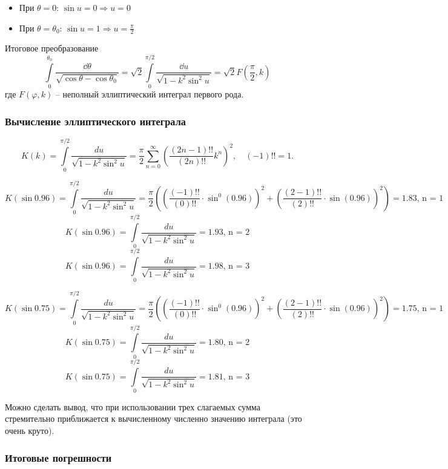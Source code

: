 \documentclass{report}
\begin{document}
\begin{enumerate}
\begin{itemize}
\item При $\theta = 0$: $\sin u = 0 \Rightarrow u = 0$
\item При $\theta = \theta_0$: $\sin u = 1 \Rightarrow u = \frac{\pi}{2}$
\end{itemize}

Итоговое преобразование
\begin{equation}
\int\limits_0^{\theta_0} \frac{\dd{\theta}}{\sqrt{\cos\theta - \cos\theta_0}} = \sqrt{2} \int\limits_0^{\pi/2} \frac{\dd{u}}{\sqrt{1 - k^2\sin^2 u}} = \sqrt{2} F\left(\frac{\pi}{2}, k\right)
\label{eq:result}
\end{equation}
где $F(\varphi,k)$ -- неполный эллиптический интеграл первого рода.


\subsubsection{Вычисление эллиптического интеграла}

\[
K(k) = \int\limits_0^{\pi/2} \frac{du}{\sqrt{1 - k^2 \sin^2 u}} 
      = \frac{\pi}{2} \sum_{n=0}^\infty \left( \frac{(2n-1)!!}{(2n)!!} k^n \right)^2,
      \quad (-1)!! = 1.
\]

\[
K(\sin{0.96}) = \int\limits_0^{\pi/2} \frac{du}{\sqrt{1 - k^2 \sin^2 u}} 
      = \frac{\pi}{2} \left(\left( \frac{(-1)!!}{(0)!!}\cdot \sin^0(0.96) \right)^2 +\left( \frac{(2-1)!!}{(2)!!}\cdot \sin(0.96) \right)^2\right) = 1.83 \text{, n  = 1}
\]
\[
K(\sin{0.96}) = \int\limits_0^{\pi/2} \frac{du}{\sqrt{1 - k^2 \sin^2 u}} = 1.93 \text{, n  = 2}
\]
\[
K(\sin{0.96}) = \int\limits_0^{\pi/2} \frac{du}{\sqrt{1 - k^2 \sin^2 u}} = 1.98 \text{, n  = 3}
\]


\[
K(\sin{0.75}) = \int\limits_0^{\pi/2} \frac{du}{\sqrt{1 - k^2 \sin^2 u}} 
      = \frac{\pi}{2} \left(\left( \frac{(-1)!!}{(0)!!}\cdot \sin^0(0.96) \right)^2 +\left( \frac{(2-1)!!}{(2)!!}\cdot \sin(0.96) \right)^2\right) = 1.75 \text{, n  = 1}
\]
\[
K(\sin{0.75}) = \int\limits_0^{\pi/2} \frac{du}{\sqrt{1 - k^2 \sin^2 u}} = 1.80 \text{, n  = 2}
\]
\[
K(\sin{0.75}) = \int\limits_0^{\pi/2} \frac{du}{\sqrt{1 - k^2 \sin^2 u}} = 1.81 \text{, n  = 3}
\]

Можно сделать вывод, что при использовании трех слагаемых сумма стремительно приближается к вычисленному численно значению интеграла (это очень круто).

\subsubsection{Итоговые погрешности}


\end{enumerate}
\end{document}
